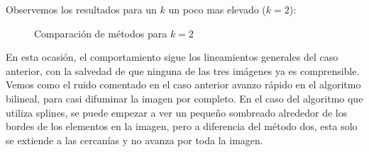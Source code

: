 Observemos los resultados para un $k$ un poco mas elevado ($k=2$):

\begin{figure}[H]
    \centering
    \qquad
    \qquad
    \caption{Comparación de métodos para $k = 2$}
    \label{fig:example}
\end{figure}

En esta ocasión, el comportamiento sigue los lineamientos generales del caso anterior, con la salvedad de que ninguna de las tres imágenes ya es comprensible. Vemos como el ruido comentado en el caso anterior avanzo rápido en el algoritmo bilineal, para casi difuminar la imagen por completo. En el caso del algoritmo que utiliza splines, se puede empezar a ver un pequeño sombreado alrededor de los bordes de los elementos en la imagen, pero a diferencia del método dos, esta solo se extiende a las cercanías y no avanza por toda la imagen.

